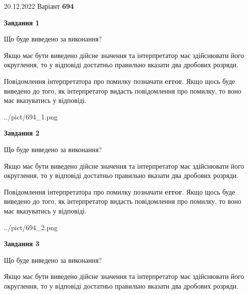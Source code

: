 \documentclass[12pt, ukrainian]{article}
\begin{document}
{20.12.2022 Варіант \No \textbf { 694 }\par}
{
\begin {Large}

{\begin {center}\textbf{Завдання 1}\end {center}}\par
Що буде виведено за виконання? \par

Якщо має бути виведено дійсне значення та інтерпретатор має здійснювати його округлення, 
то у відповіді достатньо правильно вказати два дробових розряди.

Повідомлення інтерпретатора про помилку позначати \textbf{error}.
Якщо щось буде виведено до того, як інтерпретатор видасть повідомлення про помилку, 
то воно має вказуватись у відповіді. \par

\begin{center}
	{../pict/694_1.png}
\end{center}
\newpage

{\begin {center}\textbf{Завдання 2}\end {center}}\par
Що буде виведено за виконання? \par

Якщо має бути виведено дійсне значення та інтерпретатор має здійснювати його округлення, 
то у відповіді достатньо правильно вказати два дробових розряди.

Повідомлення інтерпретатора про помилку позначати \textbf{error}.
Якщо щось буде виведено до того, як інтерпретатор видасть повідомлення про помилку, 
то воно має вказуватись у відповіді. \par

\begin{center}
	{../pict/694_2.png}
\end{center}
\newpage

{\begin {center}\textbf{Завдання 3}\end {center}}\par
Що буде виведено за виконання? \par

Якщо має бути виведено дійсне значення та інтерпретатор має здійснювати його округлення, 
то у відповіді достатньо правильно вказати два дробових розряди.


\end{Large}}
\end{document}
